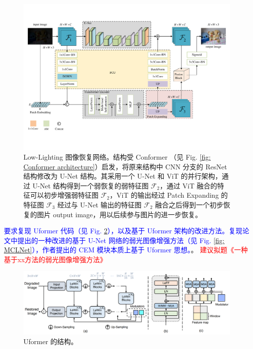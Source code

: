 \documentclass[a4paper]{ctexart}
\begin{document}
	\begin{figure}[htb]
		\centering 
		\includegraphics[width=\columnwidth]{picture/LLIE/My Architecture/The proposed initial architecture}
		\caption{
			\label{fig: The proposed architecture} 
			Low-Lighting 图像恢复网络。结构受 Conformer\cite{peng2021conformer} （见 Fig. \ref{fig: Conformer architecture}）启发，将原来结构中 CNN 分支的 ResNet 结构修改为 U-Net 结构。其采用一个 U-Net 和 ViT 的并行架构，通过 U-Net 结构得到一个弱恢复的弱特征图 $\mathcal{F}_2$，通过 ViT 融合的特征可以初步增强弱特征图 $\mathcal{F}_2$，ViT 的输出经过 Patch Expanding 的特征图 $\mathcal{F}_3$ 经过与 U-Net 输出的特征图 $\mathcal{F}_2$ 融合之后得到一个初步恢复的图片 output image，用以后续参与图片的进一步恢复。
		}
	\end{figure}
	
	\textcolor{blue}{要求复现 Uformer\cite{wang2022uformer} 代码（见 Fig. \ref{fig: Uformer}），以及基于 Uformer 架构的改进方法\cite{li2023effective}。复现论文\cite{li2023effective}中提出的一种改进的基于 U-Net 网络的弱光图像增强方法（见 Fig. \ref{fig: MCLNet}），作者提出的 CEM 模块本质上基于 Uformer 思想。}。	
	\textcolor{red}{建议拟题《一种基于xx方法的弱光图像增强方法》}
	
	\begin{figure}[htb]
		\centering 
		\includegraphics[width=\columnwidth]{picture/LLIE/Uformer/Uformer}
		\caption{
			\label{fig: Uformer} 
			Uformer 的结构。
		}
	\end{figure}
	
\end{document}
